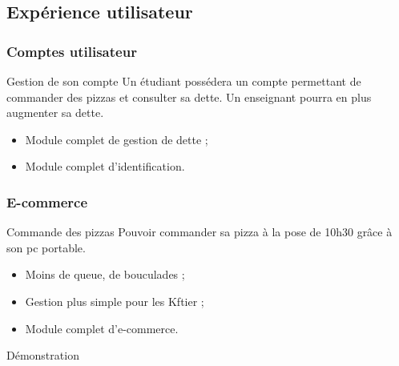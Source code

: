 \documentclass{polytech-presentation}
\begin{document}
            \subsection<presentation>{Expérience utilisateur}%
                \begin{frame}
                    \frametitle{Comptes utilisateur}
                    \begin{block}{Gestion de son compte}
                        Un étudiant possédera un compte permettant de commander des pizzas et consulter sa dette. Un enseignant pourra en plus augmenter sa dette.
                    \end{block}
                    \begin{itemize}
                        \item Module complet de gestion de dette ;
                        \item Module complet d'identification.
                    \end{itemize}
                            \end{frame}
                \begin{frame}
                    \frametitle{E-commerce}
                    \begin{block}{Commande des pizzas}
                        Pouvoir commander sa pizza à la pose de 10h30 grâce à son pc portable.
                    \end{block}
                    \begin{itemize}
                        \item Moins de queue, de bouculades ;
                        \item Gestion plus simple pour les Kftier ;
                        \item Module complet d'e-commerce.
                    \end{itemize}
                            \end{frame}
                \begin{frame}
                    \begin{center}
                        Démonstration
                    \end{center}
                \end{frame}%
\end{document}
